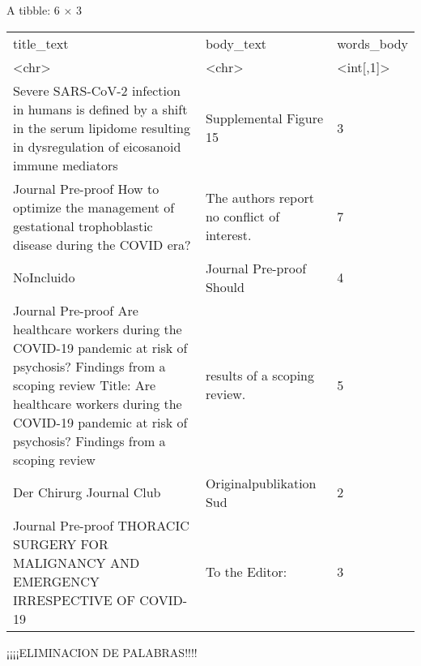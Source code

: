 \documentclass[11pt]{article}
\begin{document}
    A tibble: 6 × 3
\begin{tabular}{lll}
 title\_text & body\_text & words\_body\\
 <chr> & <chr> & <int{[},1{]}>\\
\hline
	 Severe SARS-CoV-2 infection in humans is defined by a shift in the serum lipidome resulting in dysregulation of eicosanoid immune mediators                                                                                                &  Supplemental Figure 15                       & 3\\
	 Journal Pre-proof How to optimize the management of gestational trophoblastic disease during the COVID era?                                                                                                                                &  The authors report no conflict of interest.  & 7\\
	 NoIncluido                                                                                                                                                                                                                                 &  Journal Pre-proof Should                     & 4\\
	 Journal Pre-proof Are healthcare workers during the COVID-19 pandemic at risk of psychosis? Findings from a scoping review Title: Are healthcare workers during the COVID-19 pandemic at risk of psychosis? Findings from a scoping review &  results of a scoping review.                 & 5\\
	 Der Chirurg Journal Club                                                                                                                                                                                                                   &  Originalpublikation Sud                      & 2\\
	 Journal Pre-proof THORACIC SURGERY FOR MALIGNANCY AND EMERGENCY IRRESPECTIVE OF COVID-19                                                                                                                                                   &  To the Editor:                               & 3\\
\end{tabular}


    
    ¡¡¡¡ELIMINACION DE PALABRAS!!!!
\end{document}
